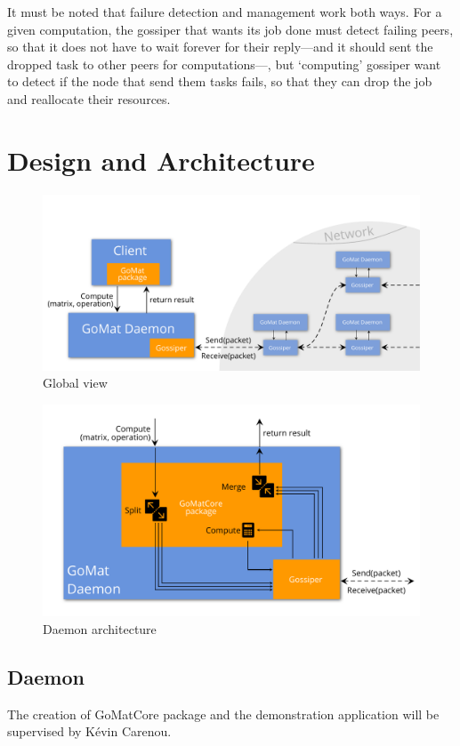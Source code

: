 \documentclass[a4paper,12pt]{article}
\begin{document}
    It must be noted that failure detection and management work both ways. For a given computation, the gossiper that wants its job done must detect failing peers, so that it does not have to wait forever for their reply---and it should sent the dropped task to other peers for computations---, but ‘computing’ gossiper want to detect if the node that send them tasks fails, so that they can drop the job and reallocate their resources.

    \section{Design and Architecture}
    \begin{figure}[!ht]
        \includegraphics[width=.95\textwidth]{global_view.pdf}
        \caption{Global view}
        \label{glbView}
    \end{figure}
    \begin{figure}[!ht]
        \includegraphics[width=.95\textwidth]{daemon_view.pdf}
        \caption{Daemon architecture}
        \label{daemonView}
    \end{figure}
        \subsection{Daemon}
        The creation of GoMatCore package and the demonstration application will be supervised by Kévin Carenou.
\end{document}
